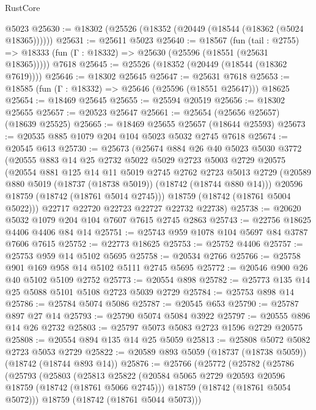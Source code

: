 \begin{lexlean}{RustCore}
\begin{coremodule}
    @5023
@25630 := @18302 (@25526 (@18352 (@20449 (@18544 (@18362 (@5024 @18365))))))
@25631 := @25611 @5023
@25640 := @18567
    (fun (tail : @2755) => @18333 (fun (Γ : @18332) => @25630 (@25596 (@18551 (@25631 @18365)))))
    @7618
@25645 := @25526 (@18352 (@20449 (@18544 (@18362 @7619))))
@25646 := @18302 @25645
@25647 := @25631 @7618
@25653 := @18585 (fun (Γ : @18332) => @25646 (@25596 (@18551 @25647))) @18625
@25654 := @18469 @25645
@25655 := @25594 @20519
@25656 := @18302 @25655
@25657 := @20523 @25647
@25661 := @25654 (@25656 @25657) (@18639 @25525)
@25665 := @18469 @25655 @25657 (@18644 @25593)
@25673 := @20535 @885 @1079 @204 @104 @5023 @5032 @2745 @7618
@25674 := @20545 @613
@25730 := @25673
    (@25674
      @884
      @26
      @40
      @5023
      @5030
      @3772
      (@20555
        @883
        @14
        @25
        @2732
        @5022
        @5029
        @2723
        @5003
        @2729
        @20575
        (@20554
          @881
          @125
          @14
          @11
          @5019
          @2745
          @2762
          @2723
          @5013
          @2729
          (@20589 @880 @5019 (@18737 (@18738 @5019)) (@18742 (@18744 @880 @14)))
          @20596
          @18759
          (@18742 (@18761 @5014 @2745)))
        @18759
        (@18742 (@18761 @5004 @5022)))
      @22717
      @22720
      @22723
      @22727
      @22732
      @22738)
@25738 := @20620 @5032 @1079 @204 @104 @7607 @7615 @2745 @2863
@25743 := @22756 @18625 @4406 @4406 @84 @14
@25751 := @25743 @959 @1078 @104 @5697 @84 @3787 @7606 @7615
@25752 := @22773 @18625
@25753 := @25752 @4406
@25757 := @25753 @959 @14 @5102 @5695
@25758 := @20534 @2766
@25766 := @25758 @901 @169 @958 @14 @5102 @5111 @2745 @5695
@25772 := @20546 @900 @26 @40 @5102 @5109 @2752
@25773 := @20554 @898
@25782 := @25773 @135 @14 @25 @5088 @5101 @5108 @2723 @5039 @2729
@25784 := @25753 @898 @14
@25786 := @25784 @5074 @5086
@25787 := @20545 @653
@25790 := @25787 @897 @27 @14
@25793 := @25790 @5074 @5084 @3922
@25797 := @20555 @896 @14 @26 @2732
@25803 := @25797 @5073 @5083 @2723 @1596 @2729 @20575
@25808 := @20554 @894 @135 @14 @25 @5059
@25813 := @25808 @5072 @5082 @2723 @5053 @2729
@25822 := @20589 @893 @5059 (@18737 (@18738 @5059)) (@18742 (@18744 @893 @14))
@25876 := @25766
    (@25772
      (@25782
        (@25786
          (@25793
            (@25803
              (@25813
                @25822
                (@20584 @5065 @2729 @20593 @20596 @18759 (@18742 (@18761 @5066 @2745)))
                @18759
                (@18742 (@18761 @5054 @5072)))
              @18759
              (@18742 (@18761 @5044 @5073)))

\end{coremodule}
\end{lexlean}
